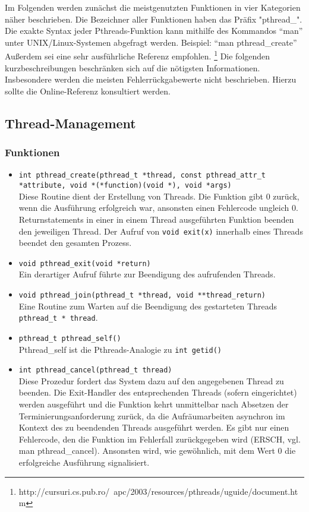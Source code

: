 \documentclass[11pt,a4paper]{article}
\begin{document}
Im Folgenden werden zunächst die meistgenutzten Funktionen in vier Kategorien näher beschrieben.
Die Bezeichner aller Funktionen haben das Präfix "pthread\_". 
Die exakte Syntax jeder Pthreads-Funktion kann mithilfe des Kommandos ``man'' unter UNIX/Linux-Systemen
abgefragt werden. Beispiel: ``man pthread\_create''
Außerdem sei eine sehr ausführliche Referenz empfohlen. \footnote{http://cursuri.cs.pub.ro/~apc/2003/resources/pthreads/uguide/document.htm}
Die folgenden kurzbeschreibungen beschränken sich auf die nötigsten Informationen. Insbesondere werden die meisten Fehlerrückgabewerte nicht
beschrieben. Hierzu sollte die Online-Referenz konsultiert werden.

\subsection{Thread-Management}
\subsubsection{Funktionen}
\begin{itemize}
	\item \lstinline$int pthread_create(pthread_t *thread, const pthread_attr_t *attribute, void *(*function)(void *), void *args)$\\
	Diese Routine dient der Erstellung von Threads. Die Funktion gibt 0 zurück, wenn die Ausführung erfolgreich war, ansonsten einen Fehlercode ungleich 0. 
	Returnstatements in einer in einem Thread ausgeführten Funktion beenden den jeweiligen Thread. 
	Der Aufruf von \lstinline$void exit(x)$ innerhalb eines Threads beendet den gesamten Prozess.

	\item \lstinline$void pthread_exit(void *return)$\\
	Ein derartiger Aufruf führte zur Beendigung des aufrufenden Threads.

	\item \lstinline$void pthread_join(pthread_t *thread, void **thread_return)$\\
	Eine Routine zum Warten auf die Beendigung des gestarteten Threads \lstinline$pthread_t * thread$.

	\item \lstinline$pthread_t pthread_self()$ \\
	Pthread\_self ist die Pthreads-Analogie zu \lstinline$int getid()$

	\item \lstinline$int pthread_cancel(pthread_t thread)$ \\
	Diese Prozedur fordert das System dazu auf den angegebenen Thread zu beenden. 
	Die Exit-Handler des entsprechenden Threads (sofern eingerichtet) werden ausgeführt und die Funktion kehrt unmittelbar nach Absetzen der Terminierungsanforderung zurück, da die Aufräumarbeiten asynchron im Kontext des zu beendenden Threads ausgeführt werden. 
	Es gibt nur einen Fehlercode, den die Funktion im Fehlerfall zurückgegeben wird (ERSCH, vgl. man pthread\_cancel). 
	Ansonsten wird, wie gewöhnlich, mit dem Wert 0 die erfolgreiche Ausführung signalisiert.
\end{itemize}
\end{document}
